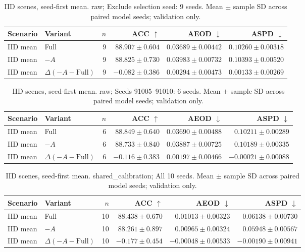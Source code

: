 \begin{table}[t]
\centering
\small
\caption{IID scenes, seed-first mean. raw; Exclude selection seed: 9 seeds. Mean $\pm$ sample SD across paired model seeds; validation only.}
\begin{tabular}{llrrrr}
\toprule
Scenario & Variant & $n$ & ACC $\uparrow$ & AEOD $\downarrow$ & ASPD $\downarrow$ \\
\midrule
IID mean & Full & 9 & $88.907 \pm 0.604$ & $0.03689 \pm 0.00442$ & $0.10260 \pm 0.00318$ \\
IID mean & $-A$ & 9 & $88.825 \pm 0.730$ & $0.03983 \pm 0.00732$ & $0.10393 \pm 0.00520$ \\
IID mean & $\Delta(-A-\mathrm{Full})$ & 9 & $-0.082 \pm 0.386$ & $0.00294 \pm 0.00473$ & $0.00133 \pm 0.00269$ \\
\bottomrule
\end{tabular}
\end{table}

\begin{table}[t]
\centering
\small
\caption{IID scenes, seed-first mean. raw; Seeds 91005–91010: 6 seeds. Mean $\pm$ sample SD across paired model seeds; validation only.}
\begin{tabular}{llrrrr}
\toprule
Scenario & Variant & $n$ & ACC $\uparrow$ & AEOD $\downarrow$ & ASPD $\downarrow$ \\
\midrule
IID mean & Full & 6 & $88.849 \pm 0.640$ & $0.03690 \pm 0.00488$ & $0.10211 \pm 0.00289$ \\
IID mean & $-A$ & 6 & $88.733 \pm 0.840$ & $0.03887 \pm 0.00725$ & $0.10189 \pm 0.00335$ \\
IID mean & $\Delta(-A-\mathrm{Full})$ & 6 & $-0.116 \pm 0.383$ & $0.00197 \pm 0.00466$ & $-0.00021 \pm 0.00088$ \\
\bottomrule
\end{tabular}
\end{table}

\begin{table}[t]
\centering
\small
\caption{IID scenes, seed-first mean. shared\_calibration; All 10 seeds. Mean $\pm$ sample SD across paired model seeds; validation only.}
\begin{tabular}{llrrrr}
\toprule
Scenario & Variant & $n$ & ACC $\uparrow$ & AEOD $\downarrow$ & ASPD $\downarrow$ \\
\midrule
IID mean & Full & 10 & $88.438 \pm 0.670$ & $0.01013 \pm 0.00323$ & $0.06138 \pm 0.00730$ \\
IID mean & $-A$ & 10 & $88.261 \pm 0.897$ & $0.00965 \pm 0.00324$ & $0.05948 \pm 0.00567$ \\
IID mean & $\Delta(-A-\mathrm{Full})$ & 10 & $-0.177 \pm 0.454$ & $-0.00048 \pm 0.00533$ & $-0.00190 \pm 0.00941$ \\
\bottomrule
\end{tabular}
\end{table}

